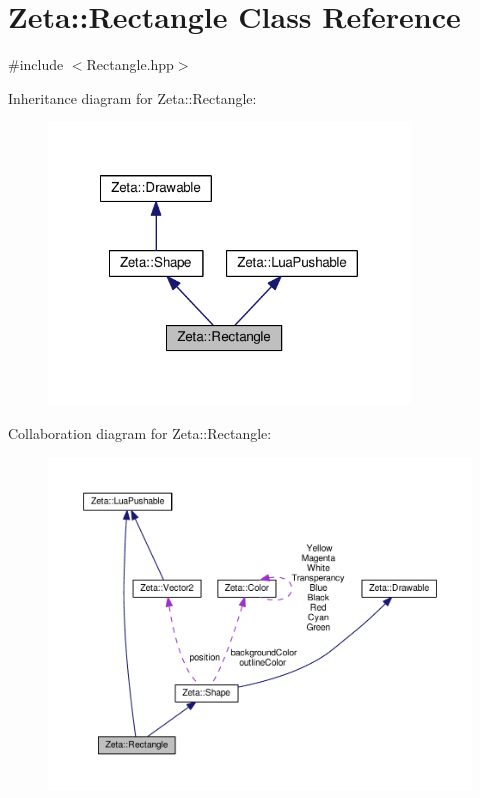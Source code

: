 \hypertarget{classZeta_1_1Rectangle}{\section{Zeta\+:\+:Rectangle Class Reference}
\label{classZeta_1_1Rectangle}
}


{\ttfamily \#include $<$Rectangle.\+hpp$>$}



Inheritance diagram for Zeta\+:\+:Rectangle\+:\nopagebreak
\begin{figure}[H]
\begin{center}
\leavevmode
\includegraphics[width=272pt]{classZeta_1_1Rectangle__inherit__graph}
\end{center}
\end{figure}


Collaboration diagram for Zeta\+:\+:Rectangle\+:\nopagebreak
\begin{figure}[H]
\begin{center}
\leavevmode
\includegraphics[width=350pt]{classZeta_1_1Rectangle__coll__graph}
\end{center}
\end{figure}
